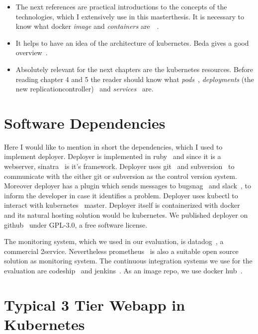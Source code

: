 \begin{itemize}

\item The next references are practical introductions to the concepts of the technologies,
  which I extensively use in this masterthesis. It is necessary to know what docker
  \emph{image} and \emph{containers}
  are~\cite{docker_orientation}~\cite{docker_orientation2}.

\item It helps to have an idea of the architecture of kubernetes. Beda gives a good
  overview~\cite{kubernetes_architecture2}.

\item Absolutely relevant for the next chapters are the kubernetes resources. Before
  reading chapter 4 and 5 the reader should know what \emph{pods}~\cite{pod},
  \emph{deployments} (the new replicationcontroller)~\cite{replicationcontroller} and
  \emph{services}~\cite{service} are.

\end{itemize}


\section{Software Dependencies}

Here I would like to mention in short the dependencies, which I used to implement
deployer. Deployer is implemented in ruby~\cite{ruby} and since it is a webserver,
sinatra~\cite{sinatra} is it's framework. Deployer uses git~\cite{git} and
subversion~\cite{svn} to communicate with the either git or subversion as the control
version system. Moreover deployer has a plugin which sends messages to
bugsnag~\cite{bugsnag} and slack~\cite{slack}, to inform the developer in case it identifies
a problem. Deployer uses kubectl to interact with kubernetes~\cite{kubernetes}
master. Deployer itself is containerized with docker~\cite{docker} and its natural hosting
solution would be kubernetes. We published deployer on github~\cite{deployer} under
GPL-3.0, a free software license.

The monitoring system, which we used in our evaluation, is datadog~\cite{datadog}, a
commercial 2service. Nevertheless prometheus~\cite{prometheus} is also a suitable open
source solution as monitoring system. The continuous integration systems we use for the
evaluation are codeship~\cite{codeship} and jenkins~\cite{jenkins}. As an image repo, we use
docker hub~\cite{dockerhub}.


\section{Typical 3 Tier Webapp in Kubernetes}

